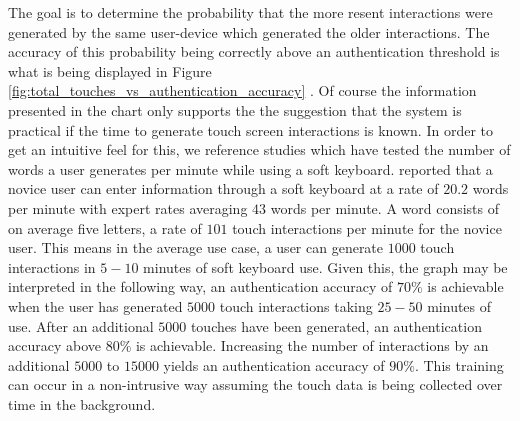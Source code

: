 %
%
The goal is to determine the probability that
the more resent interactions
were generated by the same user-device which
generated the older interactions.
%
The accuracy of this probability
being correctly above an authentication threshold 
is what is being displayed in 
Figure 
\ref{fig:total_touches_vs_authentication_accuracy}
.
%
Of course
the information presented in the chart 
only supports the
the suggestion that the system is practical 
if the time to generate touch screen interactions is known.
%
In order to get an intuitive feel for this,
we reference studies which have tested
the number of words a user generates per minute
while using a soft keyboard.
%
\cite{mackenzie1999text} reported that a
novice user can enter information through 
a soft keyboard at a rate of $20.2$ words per minute with
expert rates averaging $43$ words per minute.
%
A word consists of on average five letters, 
a rate of $101$ touch interactions per minute for the novice user.
%
This means in the average use case, 
a user can generate $1000$ touch interactions in $5-10$ minutes of 
soft keyboard use.
%
Given this,
the graph may be interpreted in the following way,
an authentication accuracy of $70\%$ is achievable 
when the user has generated $5000$ touch interactions
taking $25-50$ minutes of use.
%
After an additional $5000$ touches have been generated,
an authentication accuracy above $80\%$ is achievable.
Increasing the number of interactions 
by an additional $5000$ to $15000$ yields
an authentication accuracy of $90\%$.
%
This training can occur in a non-intrusive way
assuming the touch data is being collected over time in the background.



